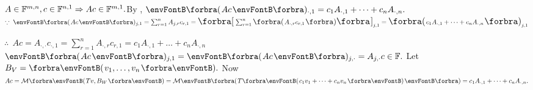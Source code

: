 \BulletPointX{}\;\;$A\in{\mathbb{F}}^{m,n},c\in{\mathbb{F}}^{n,1}\Rightarrow Ac\in{\mathbb{F}}^{m,1}.$\hfill By , $\BigPar{Ac}{_{\cdot,1}}=c_1A_{\cdot,1}+\dots+c_nA_{\cdot,n}.$\;\;\!\,\PfEnd\vspace{4pt}\quad
\Or $\because\;\BigPar{Ac}{_{j,1}}=\sum_{r=1}^n A_{j,r}c_{r,1}=\envFontLarge\Sbra{\envFontDefault\sum_{r=1}^n\BigPar{A_{\cdot,r}c_{r,1}}\envFontLarge}_{j,1}=\BigPar{c_1 A_{\cdot,1}+\dots+c_n A_{\cdot,n}}_{j,1}$\vspace{1pt}\par\quad
\Blind{\Or}$\therefore\;\,Ac=A_{\cdot,\cdot}c_{\cdot,1}=\sum_{r=1}^n A_{\cdot,r}c_{r,1}=c_1 A_{\cdot,1}+\dots+c_n A_{\cdot,n}$\;\;\Or $\BigPar{Ac}{_{j,1}}=\BigPar{Ac}{_{j,\cdot}}=A_{j,\cdot}c\in\Fbb.$\PfEnd\vspace{2pt}\quad
\Or Let $B_V=\Par{v_1,\dots,v_n}.$ Now $Ac=\Mt{Tv,B_W}=\Mt[\BigPar]{T\Par{c_1v_1+\dots+c_nv_n}}=c_1A_{\cdot,1}+\dots+c_nA_{\cdot,n}.$\PfEnd
\SepLine

